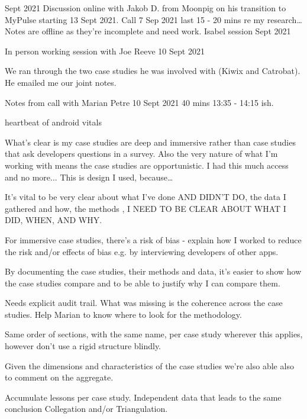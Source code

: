 
\dotfill
{} Sept 2021
Discussion online with Jakob D. from Moonpig on his transition to MyPulse starting 13 Sept 2021. 
Call 7 Sep 2021 last 15 - 20 mins re my research… Notes are offline as they're incomplete and need work.
 \dotfill
Isabel session  Sept 2021

\dotfill

In person working session with Joe Reeve 10 Sept 2021

We ran through the two case studies he was involved with (Kiwix and Catrobat). He emailed me our joint notes.

\dotfill

Notes from call with Marian Petre 10 Sept 2021
40 mins 13:35 - 14:15 ish.
 
heartbeat of android vitals

What's clear is my case studies are deep and immersive rather than case studies that ask developers questions in a survey. Also the very nature of what I'm working with means the case studies are opportunistic. I had this much access and no more... This is design I used, because…

It's vital to be very clear about what I've done AND DIDN’T DO, the data I gathered and how, the methods , I NEED TO BE CLEAR ABOUT WHAT I DID, WHEN, AND WHY.

For immersive case studies, there’s a risk of bias - explain how I worked to reduce the risk and/or effects of bias e.g. by interviewing developers of other apps.

By documenting the case studies, their methods and data, it's easier to show how the case studies compare and to be able to justify why I can compare them.

Needs explicit audit trail. What was missing is the coherence across the case studies. Help Marian to know where to look for the methodology.

Same order of sections, with the same name, per case study wherever this applies, however don't use a rigid structure blindly.

Given the dimensions and characteristics of the case studies we're also able also to comment on the aggregate.


Accumulate lessons per case study.
Independent data that leads to the same conclusion
Collegation and/or Triangulation.

